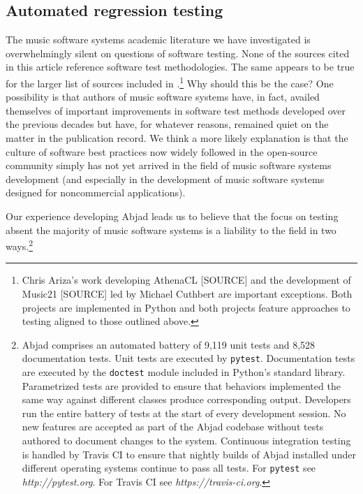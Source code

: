 \documentclass{article}
\begin{document}
\subsection{Automated regression testing}

The music software systems academic literature we have investigated is
overwhelmingly silent on questions of software testing. None of the sources
cited in this article reference software test methodologies. The same appears
to be true for the larger list of sources included in
\cite{Trevino:2013aa}.\footnote{Chris Ariza's work developing AthenaCL [SOURCE]
and the development of Music21 [SOURCE] led by Michael Cuthbert are important
exceptions. Both projects are implemented in Python and both projects feature
approaches to testing aligned to those outlined above.} Why should this be the
case? One possibility is that authors of music software systems have, in fact,
availed themselves of important improvements in software test methods developed
over the previous decades but have, for whatever reasons, remained quiet on the
matter in the publication record. We think a more likely explanation is that
the culture of software best practices now widely followed in the open-source
community simply has not yet arrived in the field of music software systems
development (and especially in the development of music software systems
designed for noncommercial applications).

Our experience developing Abjad leads us to believe that the focus on testing
absent the majority of music software systems is a liability to the field in
two ways.\footnote{Abjad comprises an automated battery of 9,119 unit tests and
8,528 documentation tests. Unit tests are executed by \texttt{pytest}.
Documentation tests are executed by the \texttt{doctest} module included in
Python's standard library. Parametrized tests are provided to ensure that
behaviors implemented the same way against different classes produce
corresponding output. Developers run the entire battery of tests at the start
of every development session. No new features are accepted as part of the Abjad
codebase without tests authored to document changes to the system. Continuous
integration testing is handled by Travis CI to ensure that nightly builds of
Abjad installed under different operating systems continue to pass all tests.
For \texttt{pytest} see \textit{http://pytest.org}. For Travis CI see
\textit{https://travis-ci.org}.}
\end{document}
